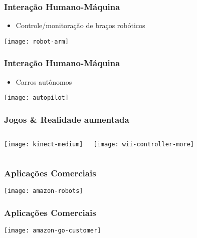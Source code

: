 
\begin{frame}
  \frametitle{Interação Humano-Máquina}
  \begin{itemize}
    \item  Controle/monitoração de braços robóticos
  \end{itemize}

  \begin{center}
    \texttt{[image: robot-arm]}
  \end{center}
\end{frame}

\begin{frame}
  \frametitle{Interação Humano-Máquina}
  \begin{itemize}
    \item  Carros autônomos
  \end{itemize}

  \begin{center}
    \texttt{[image: autopilot]}
  \end{center}
\end{frame}

\begin{frame}
    \frametitle{Jogos \& Realidade aumentada}
    \begin{columns}[T,onlytextwidth]
        \begin{center}
            \texttt{[image: kinect-medium]}
        \end{center}

        \begin{center}
            \texttt{[image: wii-controller-more]}
        \end{center}
    \end{columns}
\end{frame}

\begin{frame}
    \frametitle{Aplicações Comerciais}
        \begin{center}
            \texttt{[image: amazon-robots]}
        \end{center}
\end{frame}

\begin{frame}
    \frametitle{Aplicações Comerciais}
        \begin{center}
            \texttt{[image: amazon-go-customer]}
        \end{center}
\end{frame}

